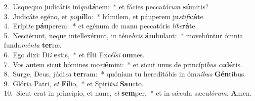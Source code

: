 {2.~}Usquequo judicátis ini\textit{qui}\textbf{tá}tem:~* et fácies pecca\textit{tó}\textit{rum} \textbf{sú}mitis?\\
{3.~}Judicáte egéno, et \textit{pu}\textbf{píl}lo:~* húmilem, et páuperem ju\textit{sti}\textit{fi}\textbf{cá}te.\\
{4.~}Erípi\textit{te} \textbf{páu}perem:~* et egénum de manu peccatóris \textit{li}\textit{be}\textbf{rá}te.\\
{5.~}Nesciérunt, neque intellexérunt, in téne\textit{bris} \textbf{ám}bulant:~* movebúntur ómnia funda\textit{mén}\textit{ta} \textbf{ter}ræ.\\
{6.~}Ego dixi: Di\textit{i} \textbf{e}stis,~* et fílii Ex\textit{cél}\textit{si} \textbf{om}nes.\\
{7.~}Vos autem sicut hómines mo\textit{ri}\textbf{é}mini:~* et sicut unus de princípi\textit{bus} \textit{ca}\textbf{dé}tis.\\
{8.~}Surge, Deus, júdi\textit{ca} \textbf{ter}ram:~* quóniam tu hereditábis in óm\textit{ni}\textit{bus} \textbf{Gén}tibus.\\
{9.~}Glória Patri, \textit{et} \textbf{Fí}lio,~* et Spirí\textit{tu}\textit{i} \textbf{San}cto.\\
{10.~}Sicut erat in princípio, et nunc, \textit{et} \textbf{sem}per,~* et in sǽcula sæcu\textit{ló}\textit{rum}. \textbf{A}men.\\
